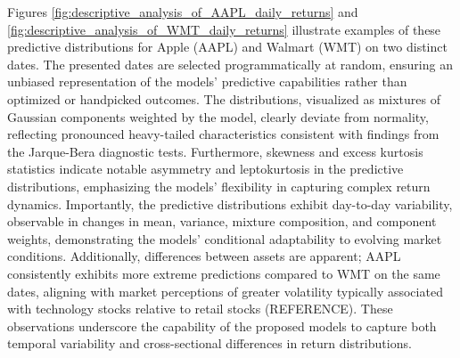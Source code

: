 Figures \ref{fig:descriptive_analysis_of_AAPL_daily_returns} and \ref{fig:descriptive_analysis_of_WMT_daily_returns} illustrate examples of these predictive distributions for Apple (AAPL) and Walmart (WMT) on two distinct dates. The presented dates are selected programmatically at random, ensuring an unbiased representation of the models' predictive capabilities rather than optimized or handpicked outcomes. The distributions, visualized as mixtures of Gaussian components weighted by the model, clearly deviate from normality, reflecting pronounced heavy-tailed characteristics consistent with findings from the Jarque-Bera diagnostic tests. Furthermore, skewness and excess kurtosis statistics indicate notable asymmetry and leptokurtosis in the predictive distributions, emphasizing the models' flexibility in capturing complex return dynamics. Importantly, the predictive distributions exhibit day-to-day variability, observable in changes in mean, variance, mixture composition, and component weights, demonstrating the models' conditional adaptability to evolving market conditions. Additionally, differences between assets are apparent; AAPL consistently exhibits more extreme predictions compared to WMT on the same dates, aligning with market perceptions of greater volatility typically associated with technology stocks relative to retail stocks (REFERENCE). These observations underscore the capability of the proposed models to capture both temporal variability and cross-sectional differences in return distributions.

